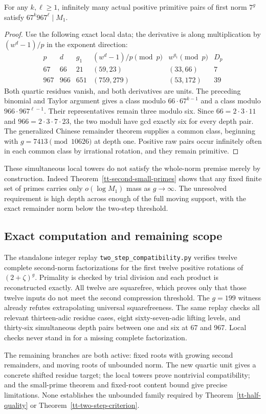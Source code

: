 \begin{theorem}
\label{tt-two-prime-lifting}
For any $k,\ell\ge1$, infinitely many actual positive primitive pairs of
first norm $7^g$ satisfy $67^k967^\ell\mid M_1$.
\end{theorem}
\begin{proof}
Use the following exact local data; the derivative is along multiplication
by $(w^d-1)/p$ in the exponent direction:
\[
\begin{array}{c|c|c|c|c|c}
p&d&g_1&(w^d-1)/p\pmod p&w^{g_1}\pmod p&D_p\\\hline
67&66&21&(59,23)&(33,66)&7\\
967&966&651&(759,279)&(53,172)&39
\end{array}
\]
Both quartic residues vanish, and both derivatives are units. The preceding
binomial and Taylor argument gives a class modulo $66\cdot67^{k-1}$ and
a class modulo $966\cdot967^{\ell-1}$. Their representatives remain three
modulo six. Since $66=2\cdot3\cdot11$ and $966=2\cdot3\cdot7\cdot23$,
the two moduli have gcd exactly six for every depth pair. The generalized
Chinese remainder theorem supplies a common class, beginning with
$g=7413\pmod{10626}$ at depth one. Positive raw pairs occur infinitely
often in each common class by irrational rotation, and they remain primitive.
\end{proof}

These simultaneous local towers do not satisfy the whole-norm premise merely
by construction. Indeed Theorem~\ref{tt-second-small-primes} shows that any
fixed finite set of primes carries only $o(\log M_1)$ mass as $g\to\infty$.
The unresolved requirement is high depth across enough of the full moving
support, with the exact remainder norm below the two-step threshold.

\subsection{Exact computation and remaining scope}
The standalone integer replay \texttt{two\_step\_compatibility.py} verifies
twelve complete second-norm factorizations for the first twelve positive
rotations of $(2+\zeta)^g$. Primality is checked by trial division and each
product is reconstructed exactly. All twelve are squarefree, which proves
only that those twelve inputs do not meet the second compression threshold.
The $g=199$ witness already refutes extrapolating universal squarefreeness.
The same replay checks all relevant thirteen-adic residue cases, eight
sixty-seven-adic lifting levels, and thirty-six simultaneous depth pairs
between one and six at 67 and 967. Local checks never stand in for a missing
complete factorization.

The remaining branches are both active: fixed roots with growing second
remainders, and moving roots of unbounded norm. The new quartic unit gives
a concrete shifted residue target; the local towers prove nontrivial
compatibility; and the small-prime theorem and fixed-root content bound give
precise limitations. None establishes the unbounded family required by
Theorem~\ref{tt-half-quality} or Theorem~\ref{tt-two-step-criterion}.
